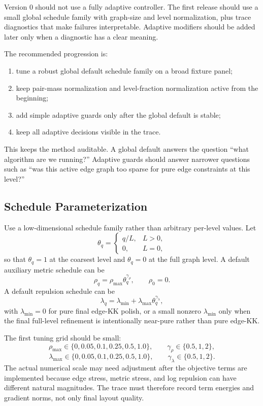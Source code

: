 \documentclass[11pt]{article}
\begin{document}
Version 0 should not use a fully adaptive controller. The first release should
use a small global schedule family with graph-size and level normalization, plus
trace diagnostics that make failures interpretable. Adaptive modifiers should
be added later only when a diagnostic has a clear meaning.

The recommended progression is:
\begin{enumerate}[leftmargin=2em]
  \item tune a robust global default schedule family on a broad fixture panel;
  \item keep pair-mass normalization and level-fraction normalization active
  from the beginning;
  \item add simple adaptive guards only after the global default is stable;
  \item keep all adaptive decisions visible in the trace.
\end{enumerate}

This keeps the method auditable. A global default answers the question
``what algorithm are we running?'' Adaptive guards should answer narrower
questions such as ``was this active edge graph too sparse for pure edge
constraints at this level?''

\subsection{Schedule Parameterization}

Use a low-dimensional schedule family rather than arbitrary per-level values.
Let
\[
  \theta_q =
  \begin{cases}
    q/L, & L>0,\\
    0, & L=0,
  \end{cases}
\]
so that \(\theta_q=1\) at the coarsest level and \(\theta_q=0\) at the full
graph level. A default auxiliary metric schedule can be
\[
  \rho_q =
  \rho_{\max}\theta_q^{\gamma_\rho},
  \qquad
  \rho_0=0.
\]
A default repulsion schedule can be
\[
  \lambda_q =
  \lambda_{\min}
  +
  \lambda_{\max}\theta_q^{\gamma_\lambda},
\]
with \(\lambda_{\min}=0\) for pure final edge-KK polish, or a small nonzero
\(\lambda_{\min}\) only when the final full-level refinement is intentionally
near-pure rather than pure edge-KK.

The first tuning grid should be small:
\[
  \rho_{\max}\in\{0,0.05,0.1,0.25,0.5,1.0\},
  \qquad
  \gamma_\rho\in\{0.5,1,2\},
\]
\[
  \lambda_{\max}\in\{0,0.05,0.1,0.25,0.5,1.0\},
  \qquad
  \gamma_\lambda\in\{0.5,1,2\}.
\]
The actual numerical scale may need adjustment after the objective terms are
implemented because edge stress, metric stress, and log repulsion can have
different natural magnitudes. The trace must therefore record term energies and
gradient norms, not only final layout quality.
\end{document}
